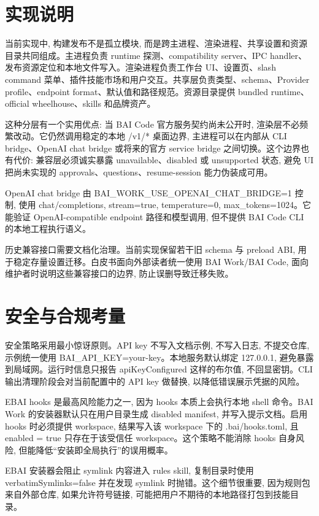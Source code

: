 \section{实现说明}
当前实现中, 构建发布不是孤立模块, 而是跨主进程、渲染进程、共享设置和资源目录共同组成。主进程负责 runtime 探测、compatibility server、IPC handler、发布资源定位和本地文件写入。渲染进程负责工作台 UI、设置页、slash command 菜单、插件技能市场和用户交互。共享层负责类型、schema、Provider profile、endpoint format、默认值和路径规范。资源目录提供 bundled runtime、official wheelhouse、skills 和品牌资产。

这种分层有一个实用优点: 当 BAI Code 官方服务契约尚未公开时, 渲染层不必频繁改动。它仍然调用稳定的本地 /v1/* 桌面边界, 主进程可以在内部从 CLI bridge、OpenAI chat bridge 或将来的官方 service bridge 之间切换。这个边界也有代价: 兼容层必须诚实暴露 unavailable、disabled 或 unsupported 状态, 避免 UI 把尚未实现的 approvals、questions、resume-session 能力伪装成可用。

OpenAI chat bridge 由 BAI\_WORK\_USE\_OPENAI\_CHAT\_BRIDGE=1 控制, 使用 chat/completions, stream=true, temperature=0, max\_tokens=1024。它能验证 OpenAI-compatible endpoint 路径和模型调用, 但不提供 BAI Code CLI 的本地工程执行语义。

历史兼容接口需要文档化治理。当前实现保留若干旧 schema 与 preload ABI, 用于稳定存量设置迁移。白皮书面向外部读者统一使用 BAI Work/BAI Code, 面向维护者时说明这些兼容接口的边界, 防止误删导致迁移失败。

\section{安全与合规考量}
安全策略采用最小惊讶原则。API key 不写入文档示例, 不写入日志, 不提交仓库, 示例统一使用 BAI\_API\_KEY=your-key。本地服务默认绑定 127.0.0.1, 避免暴露到局域网。运行时信息只报告 apiKeyConfigured 这样的布尔值, 不回显密钥。CLI 输出清理阶段会对当前配置中的 API key 做替换, 以降低错误展示凭据的风险。

EBAI hooks 是最高风险能力之一, 因为 hooks 本质上会执行本地 shell 命令。BAI Work 的安装器默认只在用户目录生成 disabled manifest, 并写入提示文档。启用 hooks 时必须提供 workspace, 结果写入该 workspace 下的 .bai/hooks.toml, 且 enabled = true 只存在于该受信任 workspace。这个策略不能消除 hooks 自身风险, 但能降低“安装即全局执行”的误用概率。

EBAI 安装器会阻止 symlink 内容进入 rules skill, 复制目录时使用 verbatimSymlinks=false 并在发现 symlink 时抛错。这个细节很重要, 因为规则包来自外部仓库, 如果允许符号链接, 可能把用户不期待的本地路径打包到技能目录。

